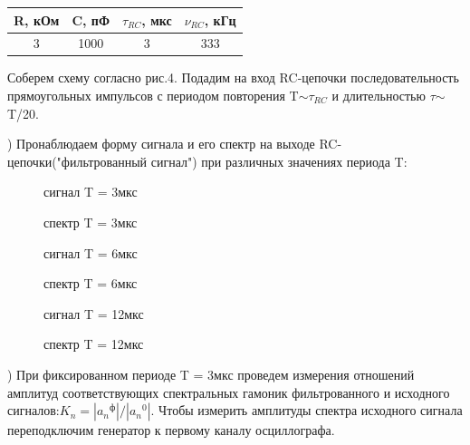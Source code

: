 \documentclass[a4paper,12pt]{article}
\begin{document}
\begin{center}
\begin{tabular}{|c|c|c|c|}
	\hline
	R, кОм & C, пФ & $\tau_{RC}$, мкс & $\nu_{RC}$, кГц \\
	\hline
	3 & 1000 & 3 & 333 \\
	\hline
\end{tabular}
\end{center}

\par Соберем схему согласно рис.4. Подадим на вход RC-цепочки последовательность прямоугольных импульсов с периодом повторения T$\sim$$\tau_{RC}$ и длительностью $\tau$$\sim$T/20. 

) Пронаблюдаем форму сигнала и его спектр на выходе RC-цепочки("фильтрованный сигнал") при различных значениях периода T:

\begin{figure}
\caption{сигнал T = 3мкс}
\end{figure}
\begin{figure}
\caption{спектр T = 3мкс}
\end{figure}
\begin{figure}
\caption{сигнал T = 6мкс}
\end{figure}
\begin{figure}
\caption{спектр T = 6мкс}
\end{figure}
\begin{figure}
\caption{сигнал T = 12мкс}
\end{figure}
\begin{figure}
\caption{спектр T = 12мкс}
\end{figure}

) При фиксированном периоде T = 3мкс проведем измерения отношений амплитуд соответствующих спектральных гамоник фильтрованного и исходного сигналов:$K_n = |{a_n}^{\text{ф}}|/|{a_n}^{\text{0}}|$. Чтобы измерить амплитуды спектра исходного сигнала переподключим генератор к первому каналу осциллографа. 
\end{document}

